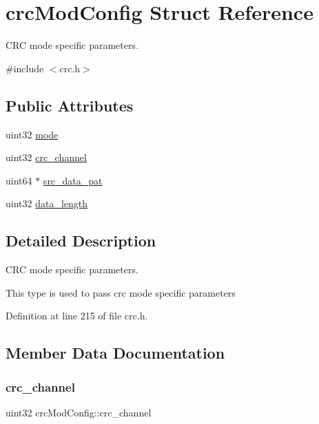 \hypertarget{structcrcModConfig}{}\section{crc\+Mod\+Config Struct Reference}
\label{structcrcModConfig}


C\+RC mode specific parameters.  




{\ttfamily \#include $<$crc.\+h$>$}

\subsection*{Public Attributes}
\begin{DoxyCompactItemize}
\item 
uint32 \mbox{\hyperlink{structcrcModConfig_a58a902f65ab46af3bb418a9331844895}{mode}}
\item 
uint32 \mbox{\hyperlink{structcrcModConfig_a11f73f23bea07c0fcf1772aa99b159c0}{crc\+\_\+channel}}
\item 
uint64 $\ast$ \mbox{\hyperlink{structcrcModConfig_afb9475d84a6a2522c47d3fbf73deb331}{src\+\_\+data\+\_\+pat}}
\item 
uint32 \mbox{\hyperlink{structcrcModConfig_a2893c12aac06a9a7b1d66707df02b6fc}{data\+\_\+length}}
\end{DoxyCompactItemize}


\subsection{Detailed Description}
C\+RC mode specific parameters. 

This type is used to pass crc mode specific parameters 

Definition at line 215 of file crc.\+h.



\subsection{Member Data Documentation}
\mbox{\label{structcrcModConfig_a11f73f23bea07c0fcf1772aa99b159c0}} 
\subsubsection{\texorpdfstring{crc\+\_\+channel}{crc\_channel}}
{\footnotesize\ttfamily uint32 crc\+Mod\+Config\+::crc\+\_\+channel}


